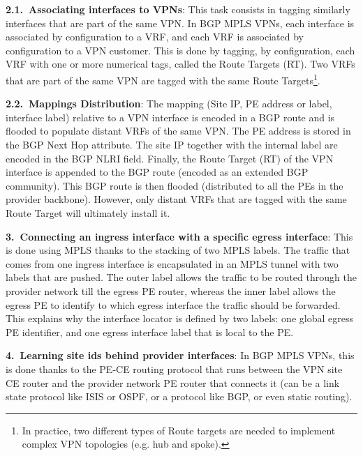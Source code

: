 \vspace{1mm}\noindent \textbf{2.1.~Associating interfaces to VPNs}: This task consists in tagging similarly interfaces that are part of the same VPN. In BGP MPLS VPNs, each interface is associated by configuration to a VRF, and each VRF is associated by configuration to a VPN customer. This is done by tagging, by configuration, each VRF with one or more numerical tags, called the Route Targets (RT). Two VRFs that are part of the same VPN are tagged with the same Route Targets\footnote{In practice, two different types of Route targets are needed to implement complex VPN topologies (e.g. hub and spoke).}.
		
\vspace{1mm}\noindent \textbf{2.2.~Mappings Distribution}: The mapping (Site IP, PE address or label, interface label) relative to a VPN interface is encoded in a BGP route and is flooded to populate distant VRFs of the same VPN. The PE address is stored in the BGP Next Hop attribute. The site IP together with the internal label are encoded in the BGP NLRI field. Finally, the Route Target (RT) of the VPN interface is appended to the BGP route (encoded as an extended BGP community). This BGP route is then flooded (distributed to all the PEs in the provider backbone). However, only distant VRFs that are tagged with the same Route Target will ultimately install it. 

\vspace{1mm}\noindent \textbf{3.~Connecting an ingress interface with a specific egress interface}: This is done using MPLS thanks to the stacking of two MPLS labels. The traffic that comes from one ingress interface is encapsulated in an MPLS tunnel with two labels that are pushed. The outer label allows the traffic to be routed through the provider network till the egress PE router, whereas the inner label allows the egress PE to identify to which egress interface the traffic should be forwarded. This explains why the interface locator is defined by two labels: one global egress PE identifier, and one egress interface label that is local to the PE. 


\vspace{1mm}\noindent \textbf{4.~Learning site ids behind provider interfaces}: In BGP MPLS VPNs, this is done thanks to the PE-CE routing protocol that runs between the VPN site CE router and the provider network PE router that connects it (can be a link state protocol like ISIS or OSPF, or a protocol like BGP, or even static routing).


